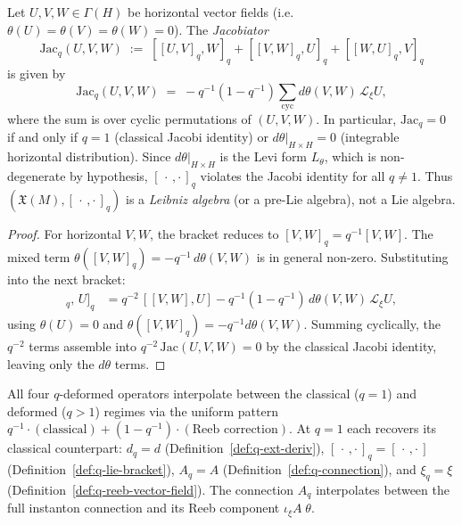 \begin{proposition}
\label{prop:q-jacobiator}
Let $U, V, W \in \Gamma(H)$ be horizontal vector fields (i.e.\
$\theta(U) = \theta(V) = \theta(W) = 0$).  The \emph{Jacobiator}
\[
  \mathrm{Jac}_q(U,V,W)
  \;:=\; [[U,V]_q, W]_q + [[V,W]_q, U]_q + [[W,U]_q, V]_q
\]
is given by
\[
  \mathrm{Jac}_q(U,V,W)
  \;=\; -q^{-1}(1-q^{-1})\!\sum_{\mathrm{cyc}}
        d\theta(V,W)\,\mathcal{L}_\xi U,
\]
where the sum is over cyclic permutations of $(U,V,W)$.  In particular,
$\mathrm{Jac}_q = 0$ if and only if $q = 1$ (classical Jacobi identity)
or $d\theta|_{H \times H} = 0$ (integrable horizontal distribution).
Since $d\theta|_{H \times H}$ is the Levi form $L_\theta$, which is
non-degenerate by hypothesis, $[\,\cdot\,,\cdot\,]_q$ violates the Jacobi
identity for all $q \neq 1$.  Thus $(\mathfrak{X}(M), [\,\cdot\,,\cdot\,]_q)$
is a \emph{Leibniz algebra} (or a pre-Lie algebra), not a Lie algebra.
\end{proposition}

\begin{proof}
For horizontal $V, W$, the bracket reduces to $[V,W]_q = q^{-1}[V,W]$.
The mixed term $\theta([V,W]_q) = -q^{-1}\,d\theta(V,W)$ is in general
non-zero.  Substituting into the next bracket:
\begin{align*}
  [[V,W]_q,\, U]_q
  &= q^{-2}\,[[V,W],U]
    - q^{-1}(1-q^{-1})\,d\theta(V,W)\,\mathcal{L}_\xi U,
\end{align*}
using $\theta(U)=0$ and $\theta([V,W]_q) = -q^{-1}d\theta(V,W)$.
Summing cyclically, the $q^{-2}$ terms assemble into $q^{-2}\,\mathrm{Jac}(U,V,W) = 0$
by the classical Jacobi identity, leaving only the $d\theta$ terms.
\end{proof}

\begin{remark}
\label{rem:classical-recovery}
All four $q$-deformed operators interpolate between the classical ($q = 1$)
and deformed ($q > 1$) regimes via the uniform pattern
$q^{-1} \cdot (\text{classical}) + (1 - q^{-1}) \cdot (\text{Reeb correction})$.
At $q = 1$ each recovers its classical counterpart:
$d_q = d$ (Definition~\ref{def:q-ext-deriv}),
$[\,\cdot\,,\cdot\,]_q = [\,\cdot\,,\cdot\,]$
(Definition~\ref{def:q-lie-bracket}),
$A_q = A$ (Definition~\ref{def:q-connection}), and
$\xi_q = \xi$ (Definition~\ref{def:q-reeb-vector-field}).
The connection $A_q$ interpolates between the full instanton connection and
its Reeb component $\iota_\xi A\;\theta$.
\end{remark}

